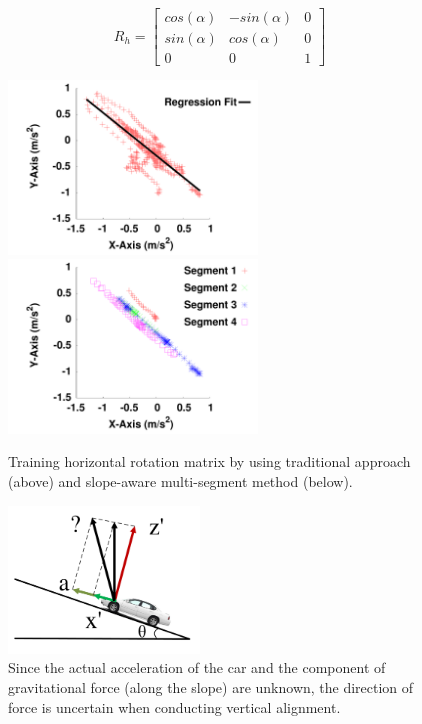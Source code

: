 \[
R_h
	=
\begin{bmatrix}
   cos(\alpha) & -sin(\alpha) & 0 \\
   sin(\alpha) & cos(\alpha) & 0 \\
   0 & 0 & 1
\end{bmatrix}
\]



\begin{figure}[!tbph] 
\hspace{-0.4cm}
  \includegraphics[width=2.6in,angle=0]{Figs/DriveSense/slopeaware/stateoftheart.pdf}
\hspace{-0.0cm}
  \includegraphics[width=2.6in,angle=0]{Figs/DriveSense/slopeaware/direction.pdf}
\hspace{-0.0cm}
   \caption{Training horizontal rotation matrix by using traditional
approach (above) and slope-aware multi-segment method (below).}
\label{direction}
\vspace{0.4cm}
\end{figure}





\begin{figure}[!htbp]
\begin{center}
\includegraphics[width=2.0in, angle=0]{Figs/DriveSense/uncertain_vertical.pdf}
\vspace{0.0cm}
	\caption{
Since the actual acceleration of the car 
and the component of gravitational force (along the slope) are unknown, 
the direction of force is uncertain when conducting vertical alignment.
}
\label{training}
\vspace{0.4cm}
\end{center}
\end{figure}



